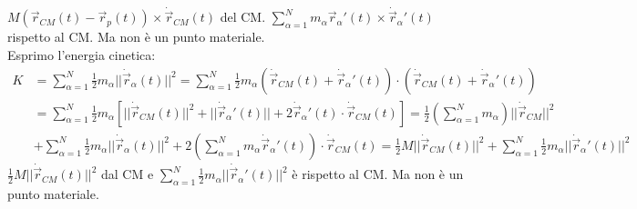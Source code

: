 $M(\vec{r}_{CM}(t) - \vec{r}_p(t)) \times \dot{\vec{r}}_{CM}(t)$ del CM. $\sum_{\alpha=1}^{N}m_{\alpha}\vec{r}_{\alpha}'(t) \times \dot{\vec{r}}_{\alpha}'(t)$ rispetto al CM. Ma non è un punto materiale.\\
Esprimo l'energia cinetica:
\begin{equation*}
    \begin{split}
        K & = \sum_{\alpha=1}^{N}\frac{1}{2}m_{\alpha}||\dot{\vec{r}}_{\alpha}(t)||^2 = \sum_{\alpha=1}^{N}\frac{1}{2}m_{\alpha}(\dot{\vec{r}}_{CM}(t) + \dot{\vec{r}}_{\alpha}'(t)) \cdot (\dot{\vec{r}}_{CM}(t) + \dot{\vec{r}}_{\alpha}'(t))\\
          & = \sum_{\alpha=1}^{N}\frac{1}{2}m_{\alpha}[||\dot{\vec{r}}_{CM}(t)||^2 + ||\dot{\vec{r}}_{\alpha}'(t)|| + 2\dot{\vec{r}}_{\alpha}'(t) \cdot \dot{\vec{r}}_{CM}(t)] = \frac{1}{2}(\sum_{\alpha=1}^{N}m_{\alpha}) ||\dot{\vec{r}}_{CM}||^2 \\
          & + \sum_{\alpha=1}^{N}\frac{1}{2}m_{\alpha}||\dot{\vec{r}}_{\alpha}(t)||^2 + 2(\sum_{\alpha=1}^{N}m_{\alpha}\dot{\vec{r}}_{\alpha}'(t)) \cdot \dot{\vec{r}}_{CM}(t) = \frac{1}{2}M ||\dot{\vec{r}}_{CM}(t)||^2 + \sum_{\alpha=1}^{N}\frac{1}{2}m_{\alpha}||\dot{\vec{r}}_{\alpha}'(t)||^2
    \end{split}
\end{equation*}
$\frac{1}{2}M ||\dot{\vec{r}}_{CM}(t)||^2$ dal CM e $\sum_{\alpha=1}^{N}\frac{1}{2}m_{\alpha}||\dot{\vec{r}}_{\alpha}'(t)||^2$ è rispetto al CM. Ma non è un punto materiale.


